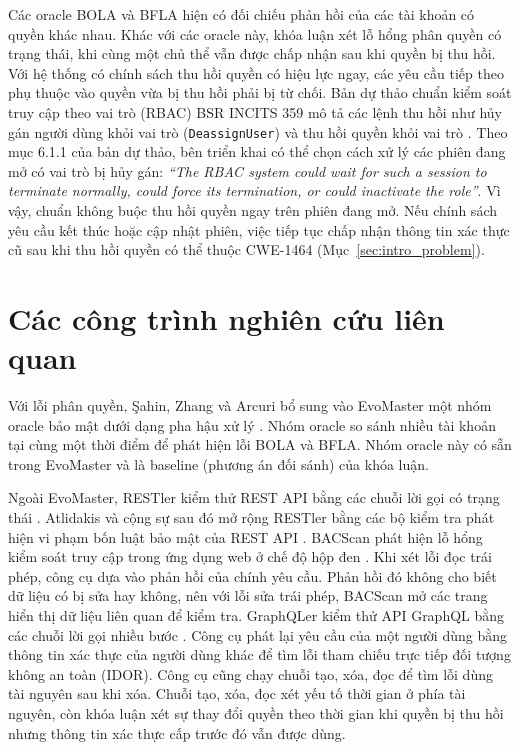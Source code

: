 Các oracle BOLA và BFLA hiện có đối chiếu phản hồi của các tài khoản có quyền khác nhau. Khác với các oracle này, khóa luận xét lỗ hổng phân quyền có trạng thái, khi cùng một chủ thể vẫn được chấp nhận sau khi quyền bị thu hồi. Với hệ thống có chính sách thu hồi quyền có hiệu lực ngay, các yêu cầu tiếp theo phụ thuộc vào quyền vừa bị thu hồi phải bị từ chối. Bản dự thảo chuẩn kiểm soát truy cập theo vai trò (RBAC) BSR INCITS 359 mô tả các lệnh thu hồi như hủy gán người dùng khỏi vai trò (\texttt{DeassignUser}) và thu hồi quyền khỏi vai trò \cite{incits359draft}. Theo mục 6.1.1 của bản dự thảo, bên triển khai có thể chọn cách xử lý các phiên đang mở có vai trò bị hủy gán: \textit{``The RBAC system could wait for such a session to terminate normally, could force its termination, or could inactivate the role''}. Vì vậy, chuẩn không buộc thu hồi quyền ngay trên phiên đang mở. Nếu chính sách yêu cầu kết thúc hoặc cập nhật phiên, việc tiếp tục chấp nhận thông tin xác thực cũ sau khi thu hồi quyền có thể thuộc CWE-1464 (Mục~\ref{sec:intro_problem}).

\section{Các công trình nghiên cứu liên quan}
\label{sec:bg_related_work}

Với lỗi phân quyền, Şahin, Zhang và Arcuri bổ sung vào EvoMaster một nhóm oracle bảo mật dưới dạng pha hậu xử lý \cite{sahin2024bola, arcuri2025issre}. Nhóm oracle so sánh nhiều tài khoản tại cùng một thời điểm để phát hiện lỗi BOLA và BFLA. Nhóm oracle này có sẵn trong EvoMaster và là baseline (phương án đối sánh) của khóa luận.

Ngoài EvoMaster, RESTler kiểm thử REST API bằng các chuỗi lời gọi có trạng thái \cite{atlidakis2019restler}. Atlidakis và cộng sự sau đó mở rộng RESTler bằng các bộ kiểm tra phát hiện vi phạm bốn luật bảo mật của REST API \cite{atlidakis2020checking}. BACScan phát hiện lỗ hổng kiểm soát truy cập trong ứng dụng web ở chế độ hộp đen \cite{liu2025bacscan}. Khi xét lỗi đọc trái phép, công cụ dựa vào phản hồi của chính yêu cầu. Phản hồi đó không cho biết dữ liệu có bị sửa hay không, nên với lỗi sửa trái phép, BACScan mở các trang hiển thị dữ liệu liên quan để kiểm tra. GraphQLer kiểm thử API GraphQL bằng các chuỗi lời gọi nhiều bước \cite{graphqler2025}. Công cụ phát lại yêu cầu của một người dùng bằng thông tin xác thực của người dùng khác để tìm lỗi tham chiếu trực tiếp đối tượng không an toàn (IDOR). Công cụ cũng chạy chuỗi tạo, xóa, đọc để tìm lỗi dùng tài nguyên sau khi xóa. Chuỗi tạo, xóa, đọc xét yếu tố thời gian ở phía tài nguyên, còn khóa luận xét sự thay đổi quyền theo thời gian khi quyền bị thu hồi nhưng thông tin xác thực cấp trước đó vẫn được dùng.

